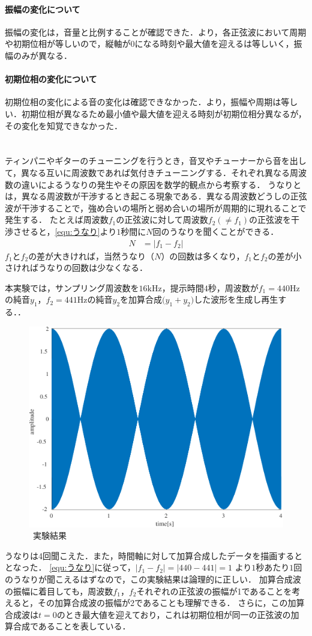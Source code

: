 \paragraph{振幅の変化について} 振幅の変化は，音量と比例することが確認できた．より，各正弦波において周期や初期位相が等しいので，縦軸が\(0\)になる時刻や最大値を迎えるは等しいく，振幅のみが異なる．
\paragraph{初期位相の変化について} 初期位相の変化による音の変化は確認できなかった．より，振幅や周期は等しい．初期位相が異なるため最小値や最大値を迎える時刻が初期位相分異なるが，その変化を知覚できなかった．
\section{\kadaiac}\label{sec:\kadaiac}
\purpose
ティンパニやギターのチューニングを行うとき，音叉やチューナーから音を出して，異なる互いに周波数であれば気付きチューニングする．それぞれ異なる周波数の違いによるうなりの発生やその原因を数学的観点から考察する．
\method
うなりとは，異なる周波数が干渉するとき起こる現象である．異なる周波数どうしの正弦波が干渉することで，強め合いの場所と弱め合いの場所が周期的に現れることで発生する．
たとえば周波数\(f_1\)の正弦波に対して周波数\(f_2(\neq f_1)\)の正弦波を干渉させると，\eqref{equ:うなり}より\(1\)秒間に\(N\)回のうなりを聞くことができる．
\begin{align}
    N & = \big|f_1-f_2\big|\label{equ:うなり}
\end{align}
\(f_1\)と\(f_2\)の差が大きければ，当然うなり（\(N\)）の回数は多くなり，\(f_1\)と\(f_2\)の差が小さければうなりの回数は少なくなる．\par
本実験では，サンプリング周波数を\(16\textrm{kHz}\)，提示時間\(4\)秒，周波数が\(f_1=440\textrm{Hz}\)の純音\(y_1\)，\(f_2=441\textrm{Hz}\)の純音\(y_2\)を加算合成\(\big(y_1+y_2\big)\)した波形を生成し再生する．\scall{}．

\begin{figure}
    \centering
    \includegraphics[keepaspectratio,width=.3\textwidth]{../../Figures/01_03.pdf}
    \caption{\kadaiac\ 実験結果}
    \label{fig:\kadaiac_実験結果}
\end{figure}
\result
うなりは4回聞こえた．また，時間軸に対して加算合成したデータを描画するととなった．
\consideration \eqref{equ:うなり}に従って，\(\big|f_1-f_2\big|= \big|440-441\big|=1\)
より\(1\)秒あたり\(1\)回のうなりが聞こえるはずなので，この実験結果は論理的に正しい．
加算合成波の振幅に着目しても，周波数\(f_1\)，\(f_2\)それぞれの正弦波の振幅が1であることを考えると，その加算合成波の振幅が2であることも理解できる．
さらに，この加算合成波は\(t=0\)のとき最大値を迎えており，これは初期位相が同一の正弦波の加算合成であることを表している．
